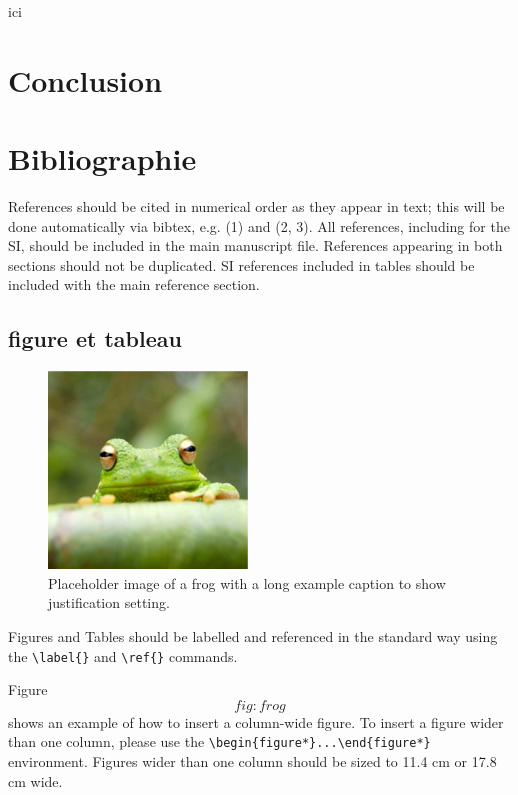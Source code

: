 \documentclass[9pt,twocolumn,twoside,]{pnas-new}
\begin{document}
ici

\hypertarget{conclusion}{%
\section*{Conclusion}\label{conclusion}}

\hypertarget{references}{%
\section*{Bibliographie}\label{references}}

References should be cited in numerical order as they appear in text;
this will be done automatically via bibtex, e.g. (1) and (2, 3). All
references, including for the SI, should be included in the main
manuscript file. References appearing in both sections should not be
duplicated. SI references included in tables should be included with the
main reference section.

\hypertarget{figure-et-tableau}{%
\subsection*{figure et tableau}\label{figure-et-tableau}}

\begin{figure}
\centering
\includegraphics{frog.png}
\caption{Placeholder image of a frog with a long example caption to show
justification setting.{}}
\end{figure}

Figures and Tables should be labelled and referenced in the standard way
using the \texttt{\textbackslash{}label\{\}} and
\texttt{\textbackslash{}ref\{\}} commands.

Figure \[fig:frog\] shows an example of how to insert a column-wide
figure. To insert a figure wider than one column, please use the
\texttt{\textbackslash{}begin\{figure*\}...\textbackslash{}end\{figure*\}}
environment. Figures wider than one column should be sized to 11.4 cm or
17.8 cm wide.
\end{document}
